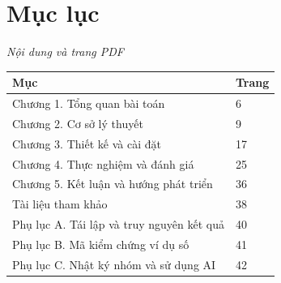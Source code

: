 \documentclass[13pt,a4paper]{extreport}
\begin{document}
\section*{Mục lục}
\noindent\textit{Nội dung và trang PDF}
\begin{longtable}{p{7.3cm}|p{7.3cm}}
Mục & Trang\\\hline
Chương 1. Tổng quan bài toán & 6\\\hline
Chương 2. Cơ sở lý thuyết & 9\\\hline
Chương 3. Thiết kế và cài đặt & 17\\\hline
Chương 4. Thực nghiệm và đánh giá & 25\\\hline
Chương 5. Kết luận và hướng phát triển & 36\\\hline
Tài liệu tham khảo & 38\\\hline
Phụ lục A. Tái lập và truy nguyên kết quả & 40\\\hline
Phụ lục B. Mã kiểm chứng ví dụ số & 41\\\hline
Phụ lục C. Nhật ký nhóm và sử dụng AI & 42\\\hline
\end{longtable}
\clearpage
\end{document}

